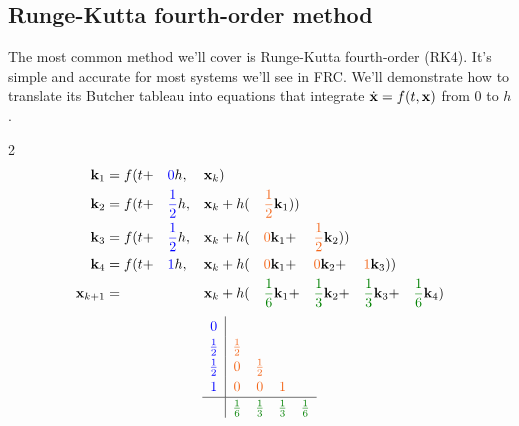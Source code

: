 \subsection{Runge-Kutta fourth-order method}

The most common method we'll cover is Runge-Kutta fourth-order (RK4). It's
simple and accurate for most systems we'll see in FRC. We'll demonstrate how to
translate its Butcher tableau into equations that integrate
$\dot{\mathbf{x}} = f(t, \mathbf{x})$ from $0$ to $h$.
\begin{multicols}{2}
  \begin{alignat*}{7}
    \mat{k}_1 &= f(t +
      && {\color{blue}0} h,
      && \mat{x}_k)
      &&
      &&
      &&
      && \\
    \mat{k}_2 &= f(t +
      && {\color{blue}\frac{1}{2}} h,
      && \mat{x}_k + h (
      && {\color{deeporange}\frac{1}{2}} \mat{k}_1))
      &&
      &&
      && \\
    \mat{k}_3 &= f(t +
      && {\color{blue}\frac{1}{2}} h,
      && \mat{x}_k + h (
      && {\color{deeporange}0} \mat{k}_1 +
      && {\color{deeporange}\frac{1}{2}} \mat{k}_2))
      &&
      && \\
    \mat{k}_4 &= f(t +
      && {\color{blue}1} h,
      && \mat{x}_k + h (
      && {\color{deeporange}0} \mat{k}_1 +
      && {\color{deeporange}0} \mat{k}_2 +
      && {\color{deeporange}1} \mat{k}_3))
      && \\
    \mat{x}_{k+1} &=
      &&
      && \mat{x}_k + h (
      && {\color{deepgreen}\frac{1}{6}} \mat{k}_1 +
      && {\color{deepgreen}\frac{1}{3}} \mat{k}_2 +
      && {\color{deepgreen}\frac{1}{3}} \mat{k}_3 +
      && {\color{deepgreen}\frac{1}{6}} \mat{k}_4)
  \end{alignat*}
  \columnbreak
  \begin{equation*}
    \renewcommand\arraystretch{1.2}
    \begin{array}{c|cccc}
      {\color{blue}0} \\
      {\color{blue}\frac{1}{2}} & {\color{deeporange}\frac{1}{2}} \\
      {\color{blue}\frac{1}{2}} & {\color{deeporange}0}           & {\color{deeporange}\frac{1}{2}} \\
      {\color{blue}1}           & {\color{deeporange}0}           & {\color{deeporange}0}           & {\color{deeporange}1} \\
      \hline
                                & {\color{deepgreen}\frac{1}{6}}  & {\color{deepgreen}\frac{1}{3}}  & {\color{deepgreen}\frac{1}{3}} & {\color{deepgreen}\frac{1}{6}}
    \end{array}
  \end{equation*}
\end{multicols}

